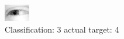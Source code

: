 \begin{figure}[h!]
\begin{center}
\includegraphics[width=0.60\columnwidth]{figures/ID2515_class_3_target_4.png}
\end{center}
\caption{ Classification: 3 actual target: 4}
\label{fig:ID2515_class_3_target_4}
\end{figure}
